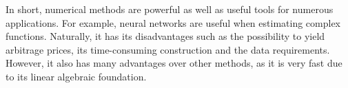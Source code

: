 In short, numerical methods are powerful as well as useful tools for numerous applications. For example, neural networks are useful when estimating complex functions. Naturally, it has its disadvantages such as the possibility to yield arbitrage prices, its time-consuming construction and the data requirements. However, it also has many advantages over other methods, as it is very fast due to its linear algebraic foundation. 

